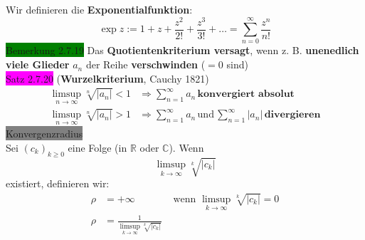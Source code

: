 \documentclass[landscape, 10pt]{article}
\newcommand{\R}{\mathbb{R}}
\newcommand{\C}{\mathbb{C}}
\begin{document}
\begin{multicols}{3}
                     Wir definieren die \textbf{Exponentialfunktion}: 
                     \begin{equation*}
                            \exp z:=1+z+\frac{z^2}{2!}+\frac{z^3}{3!}+\dots
                            =\sum_{n=0}^\infty\frac{z^n}{n!}
                     \end{equation*}
              \colorbox{green}{Bemerkung 2.7.19} 
                     Das \textbf{Quotientenkriterium versagt}, wenn z. B. 
                     \textbf{unenedlich viele Glieder} $a_n$ der Reihe 
                     \textbf{verschwinden} ($=0$ sind)\\
              \vfill\null
              \columnbreak
              \colorbox{magenta}{Satz 2.7.20}
              (\textbf{Wurzelkriterium}, Cauchy 1821)\\
                     \begin{align*}
                            \limsup\limits_{n\to\infty}
                            \sqrt[n]{|a_n|}<1
                            &\Longrightarrow
                            \sum_{n=1}^\infty a_n \,
                            \textbf{konvergiert absolut}\\
                            \limsup\limits_{n\to\infty}
                            \sqrt[n]{|a_n|}>1
                            &\Longrightarrow
                            \sum_{n=1}^\infty a_n \, 
                            \text{und} \,
                            \sum_{n=1}^\infty |a_n| \,
                            \textbf{divergieren}
                     \end{align*}
              \colorbox{gray}{Konvergenzradius} \\
                     Sei \textcolor{NavyBlue}{
                     $(c_k)_{k\geqslant0}$} 
                     eine Folge (in $\R$ oder $\C$). Wenn 
                     \begin{equation*}
                            \limsup\limits_{k\to\infty}
                            \sqrt[k]{|c_k|}
                     \end{equation*}
                     existiert, definieren wir: 
                     \begin{align*}
                            \rho&=+\infty
                            &\text{ wenn } 
                            \limsup\limits_{k\to\infty}
                            \sqrt[k]{|c_k|}=0\\
                            \rho&=\frac{1}{\limsup
                            \limits_{k\to\infty}\sqrt[k]{|c_k|}}

\end{align*}
\end{multicols}
\end{document}
